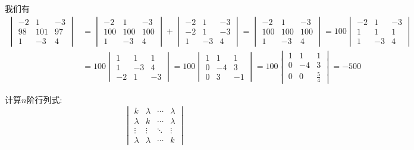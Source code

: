\documentclass{ctexart}
\begin{document}
\begin{solution}
    我们有
    \[\begin{aligned}
        \begin{vmatrix}-2&1&-3\\98&101&97\\1&-3&4\end{vmatrix}
        &= \begin{vmatrix}-2&1&-3\\100&100&100\\1&-3&4\end{vmatrix}+\begin{vmatrix}-2&1&-3\\-2&1&-3\\1&-3&4\end{vmatrix}=\begin{vmatrix}-2&1&-3\\100&100&100\\1&-3&4\end{vmatrix}=100\begin{vmatrix}-2&1&-3\\1&1&1\\1&-3&4\end{vmatrix}\\
        &=100\begin{vmatrix}1&1&1\\1&-3&4\\-2&1&-3\end{vmatrix}=100\begin{vmatrix}1&1&1\\0&-4&3\\0&3&-1\end{vmatrix}=100\begin{vmatrix}1&1&1\\0&-4&3\\0&0&\frac54\end{vmatrix}
        =-500
    \end{aligned}\]
\end{solution}
\begin{problem}
    计算$n$阶行列式:
    \[\begin{vmatrix}
        k&\lambda&\cdots&\lambda\\
        \lambda&k&\cdots&\lambda\\
        \vdots&\vdots&\ddots&\vdots\\
        \lambda&\lambda&\cdots&k
    \end{vmatrix}\]
\end{problem}
\end{document}
